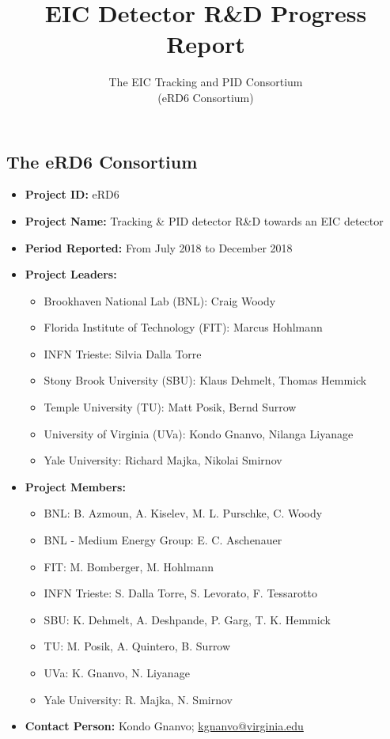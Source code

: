 \title{\bf EIC Detector R\&D Progress Report}
\author{The EIC Tracking and PID Consortium \vspace*{1mm}\\ (eRD6 Consortium)}
\maketitle
%

\subsection*{The eRD6 Consortium} 
\begin{itemize}
\item[] {\bf Project ID:} eRD6
\item[] {\bf Project Name:} Tracking \& PID detector R\&D towards an EIC detector
\item[]{\bf Period Reported:} From July 2018 to December 2018
\item[]{\bf Project Leaders:}
%
\begin{itemize}
\item[] Brookhaven National Lab (BNL): Craig Woody
\item[] Florida Institute of Technology (FIT): Marcus Hohlmann
\item[] INFN Trieste: Silvia Dalla Torre
\item[] Stony Brook University (SBU): Klaus Dehmelt, Thomas Hemmick
\item[] Temple University (TU): Matt Posik, Bernd Surrow
\item[] University of Virginia (UVa): Kondo Gnanvo, Nilanga Liyanage
\item[] Yale University: Richard Majka, Nikolai Smirnov
\end{itemize}
%
\item[]{\bf Project Members:}
%
\begin{itemize}
\item[] BNL: B. Azmoun, A. Kiselev, M. L. Purschke, C. Woody
\item[] BNL - Medium Energy Group: E. C. Aschenauer
\item[] FIT: M. Bomberger, M. Hohlmann
\item[] INFN Trieste: S. Dalla Torre, S. Levorato, F. Tessarotto
\item[] SBU: K. Dehmelt, A. Deshpande, P. Garg, T. K. Hemmick
\item[] TU: M. Posik, A. Quintero, B. Surrow
\item[] UVa: K. Gnanvo, N. Liyanage
\item[] Yale University: R. Majka, N. Smirnov
\end{itemize}
%
\item[]{\bf Contact Person:} Kondo Gnanvo; \href{mailto:kgnanvo@virginia.edu}{kgnanvo@virginia.edu}
%
\end{itemize}
